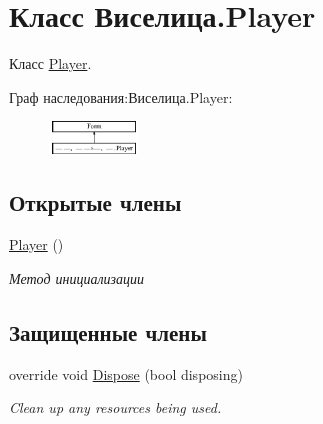 \hypertarget{class_xD0_x92_xD0_xB8_xD1_x81_xD0_xB5_xD0_xBB_xD0_xB8_xD1_x86_xD0_xB0_1_1_player}{\section{Класс Виселица.\+Player}
\label{class_xD0_x92_xD0_xB8_xD1_x81_xD0_xB5_xD0_xBB_xD0_xB8_xD1_x86_xD0_xB0_1_1_player}
}


Класс \hyperlink{class_xD0_x92_xD0_xB8_xD1_x81_xD0_xB5_xD0_xBB_xD0_xB8_xD1_x86_xD0_xB0_1_1_player}{Player}.  


Граф наследования\+:Виселица.\+Player\+:\begin{figure}[H]
\begin{center}
\leavevmode
\includegraphics[height=0.873635cm]{class_xD0_x92_xD0_xB8_xD1_x81_xD0_xB5_xD0_xBB_xD0_xB8_xD1_x86_xD0_xB0_1_1_player}
\end{center}
\end{figure}
\subsection*{Открытые члены}
\begin{DoxyCompactItemize}
\item 
\hyperlink{class_xD0_x92_xD0_xB8_xD1_x81_xD0_xB5_xD0_xBB_xD0_xB8_xD1_x86_xD0_xB0_1_1_player_a5cec4eb8abd2040b26387a4cc5021144}{Player} ()
\begin{DoxyCompactList}\small\item\em Метод инициализации \end{DoxyCompactList}\end{DoxyCompactItemize}
\subsection*{Защищенные члены}
\begin{DoxyCompactItemize}
\item 
override void \hyperlink{class_xD0_x92_xD0_xB8_xD1_x81_xD0_xB5_xD0_xBB_xD0_xB8_xD1_x86_xD0_xB0_1_1_player_a798e3b07c0fff8707479301a4472ade2}{Dispose} (bool disposing)
\begin{DoxyCompactList}\small\item\em Clean up any resources being used. \end{DoxyCompactList}\end{DoxyCompactItemize}


